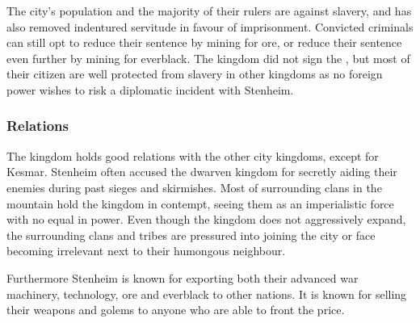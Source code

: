 The city's population and the majority of their rulers are against slavery,
and has also removed indentured servitude in favour of imprisonment. Convicted
criminals can still opt to reduce their sentence by mining for ore, or reduce
their sentence even further by mining for everblack. The kingdom did not sign
the , but most of their citizen are well protected
from slavery in other kingdoms as no foreign power wishes to risk a diplomatic
incident with Stenheim.

\subsubsection{Relations}

The kingdom holds good relations with the other city kingdoms, except for
Kesmar. Stenheim often accused the dwarven kingdom for secretly aiding their
enemies during past sieges and skirmishes. Most of surrounding clans in the
mountain hold the kingdom in contempt, seeing them as an imperialistic force
with no equal in power. Even though the kingdom does not aggressively expand,
the surrounding clans and tribes are pressured into joining the city or face
becoming irrelevant next to their humongous neighbour.

Furthermore Stenheim is known for exporting both their advanced war machinery,
technology, ore and everblack to other nations. It is known for selling their
weapons and golems to anyone who are able to front the price.
